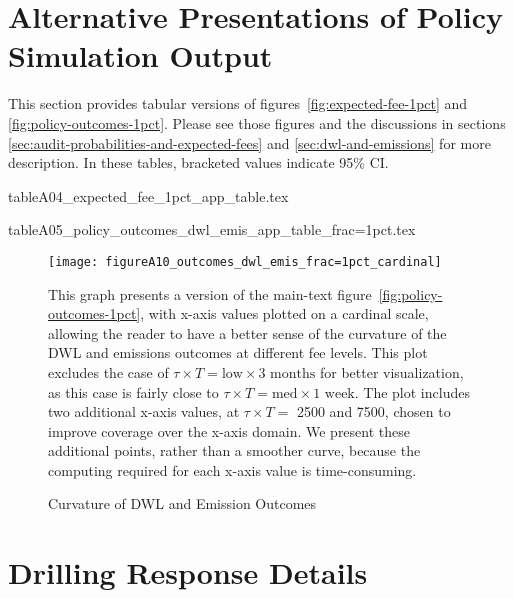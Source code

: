 \iftoggle{endfloat}{}{\FloatBarrier} %



\newpage
\section{Alternative Presentations of Policy Simulation Output}
\label{app:tabular-policy-output}

This section provides tabular versions of figures~\ref{fig:expected-fee-1pct} and \ref{fig:policy-outcomes-1pct}.
Please see those figures and the discussions in sections
\ref{sec:audit-probabilities-and-expected-fees} and
\ref{sec:dwl-and-emissions} for more description.
In these tables, bracketed values indicate 95\% \gls{CI}.

{tableA04_expected_fee_1pct_app_table.tex}


{tableA05_policy_outcomes_dwl_emis_app_table_frac=1pct.tex}


\begin{figure}[!bthp]
  \caption{Curvature of \gls{DWL} and Emission Outcomes}
  \label{fig:policy-outcomes-1pct-cardinal}
  \texttt{[image: figureA10\_outcomes\_dwl\_emis\_frac=1pct\_cardinal]}

This graph presents a version of the main-text figure~\ref{fig:policy-outcomes-1pct}, with x-axis values plotted on a cardinal scale, allowing the reader to have a better sense of the curvature of the \gls{DWL} and emissions outcomes at different fee levels.
This plot excludes the case of \(\tau \times T = \text{low} \times \text{3 months}\) for better visualization, as this case is fairly close to \(\tau \times T = \text{med} \times \text{1 week}\).
The plot includes two additional x-axis values, at \(\tau \times T = \) 2500 and 7500, chosen to improve coverage over the x-axis domain.
We present these additional points, rather than a smoother curve, because the computing required for each x-axis value is time-consuming.
\end{figure}

\iftoggle{endfloat}{}{\FloatBarrier} %


\newpage
\section{Drilling Response Details}
\label{app:drilling-response-details}

